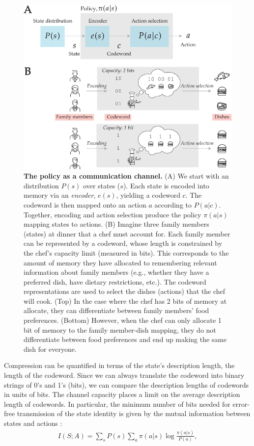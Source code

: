 \documentclass[11pt]{article}
\begin{document}
\begin{figure}
    \centering
    \includegraphics[width=\textwidth]{figs/diagram.pdf}
    \caption{\textbf{The policy as a communication channel.} (A) We start with an distribution $P(s)$ over states ($s$). Each state is encoded into memory via an \textit{encoder}, $e(s)$, yielding a codeword $c$. The codeword is then mapped onto an action $a$ according to $P(a|c)$. Together, encoding and action selection produce the policy $\pi(a|s)$ mapping states to actions. (B) Imagine three family members (states) at dinner that a chef must account for. Each family member can be represented by a codeword, whose length is constrained by the chef's capacity limit (measured in bits). This corresponds to the amount of memory they have allocated to remembering relevant information about family members (e.g., whether they have a preferred dish, have dietary restrictions, etc.). The codeword representations are used to select the dishes (actions) that the chef will cook. (Top) In the case where the chef has 2 bits of memory at allocate, they can differentiate between family members' food preferences. (Bottom) However, when the chef can only allocate 1 bit of memory to the family member-dish mapping, they do not differentiate between food preferences and end up making the same dish for everyone.}
    \label{fig:diagram}
\end{figure}

Compression can be quantified in terms of the state's description length, the length of the codeword. Since we can always translate the codeword into binary strings of 0's and 1's (bits), we can compare the description lengths of codewords in units of bits. The channel capacity places a limit on the average description length of codewords. In particular, the minimum number of bits needed for error-free transmission of the state identity is given by the mutual information between states and actions \citep{shannon48}:
\begin{align}
    I(S;A) = \sum_{s} P(s) \sum_{a} \pi(a|s) \log \frac{\pi(a|s)}{P(a)},
\end{align}
\end{document}
